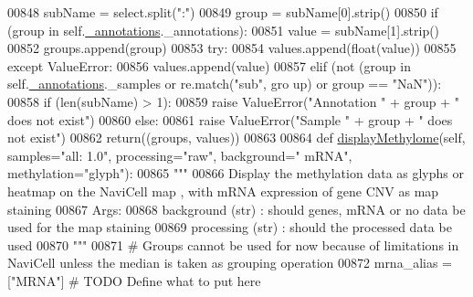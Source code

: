\begin{DoxyCode}
00848             subName = select.split(\textcolor{stringliteral}{":"})
00849             group = subName[0].strip()
00850             \textcolor{keywordflow}{if} (group \textcolor{keywordflow}{in} self.\hyperlink{classnavicom_1_1navicom_1_1NaviCom_afb88722efeb86813dcb85818b7065330}{_annotations}.\_annotations):
00851                 value = subName[1].strip()
00852                 groups.append(group)
00853                 \textcolor{keywordflow}{try}:
00854                     values.append(float(value))
00855                 \textcolor{keywordflow}{except} ValueError:
00856                     values.append(value)
00857             \textcolor{keywordflow}{elif} (\textcolor{keywordflow}{not} (group \textcolor{keywordflow}{in} self.\hyperlink{classnavicom_1_1navicom_1_1NaviCom_afb88722efeb86813dcb85818b7065330}{_annotations}.\_samples \textcolor{keywordflow}{or} re.match(\textcolor{stringliteral}{"sub"}, gro
      up) \textcolor{keywordflow}{or} group == \textcolor{stringliteral}{"NaN"})):
00858                 \textcolor{keywordflow}{if} (len(subName) > 1):
00859                     \textcolor{keywordflow}{raise} ValueError(\textcolor{stringliteral}{"Annotation "} + group + \textcolor{stringliteral}{" does not exist"})
00860                 \textcolor{keywordflow}{else}:
00861                     \textcolor{keywordflow}{raise} ValueError(\textcolor{stringliteral}{"Sample "} + group + \textcolor{stringliteral}{" does not exist"})
00862         \textcolor{keywordflow}{return}((groups, values))
00863 
00864     \textcolor{keyword}{def }\hyperlink{classnavicom_1_1navicom_1_1NaviCom_a018f936de625af8a5dd7e8250ede6483}{displayMethylome}(self, samples="all: 1.0\textcolor{stringliteral}{", processing="}raw\textcolor{stringliteral}{", background="
      }mRNA\textcolor{stringliteral}{", methylation="}glyph\textcolor{stringliteral}{"):}
00865 \textcolor{stringliteral}{        }\textcolor{stringliteral}{"""}
00866 \textcolor{stringliteral}{            Display the methylation data as glyphs or heatmap on the NaviCell map
      , with mRNA expression of gene CNV as map staining}
00867 \textcolor{stringliteral}{            Args:}
00868 \textcolor{stringliteral}{                background (str) : should genes, mRNA or no data be used for the 
      map staining}
00869 \textcolor{stringliteral}{                processing (str) : should the processed data be used}
00870 \textcolor{stringliteral}{        """}
00871         \textcolor{comment}{# Groups cannot be used for now because of limitations in NaviCell unless
       the median is taken as grouping operation}
00872         mrna\_alias = [\textcolor{stringliteral}{"MRNA"}] \textcolor{comment}{# TODO Define what to put here}

\end{DoxyCode}
